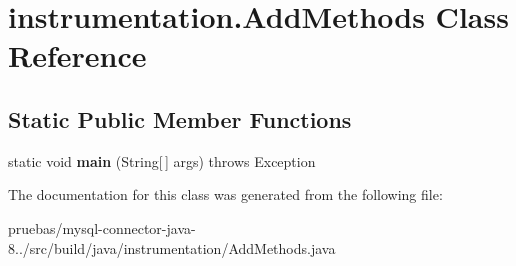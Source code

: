 \hypertarget{classinstrumentation_1_1_add_methods}{}\section{instrumentation.\+Add\+Methods Class Reference}
\label{classinstrumentation_1_1_add_methods}
\subsection*{Static Public Member Functions}
\begin{DoxyCompactItemize}
\item 
\mbox{\label{classinstrumentation_1_1_add_methods_a8e79a5b286ede3d86bc53179f52dbf55}} 
static void {\bfseries main} (String\mbox{[}$\,$\mbox{]} args)  throws Exception 
\end{DoxyCompactItemize}


The documentation for this class was generated from the following file\+:\begin{DoxyCompactItemize}
\item 
pruebas/mysql-\/connector-\/java-\/8../src/build/java/instrumentation/Add\+Methods.\+java\end{DoxyCompactItemize}
